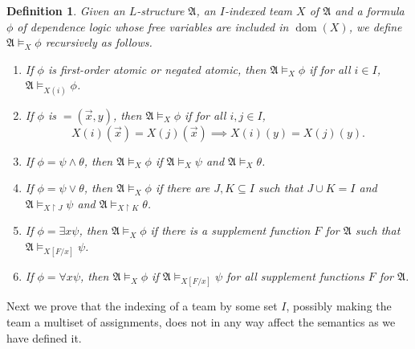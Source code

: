 \documentclass[10pt,a4paper]{amsart}
\newtheorem{definition}{Definition}[section]
\newcommand{\A}{\mathfrak{A}}
\newcommand{\dep}{\mathop{=}}
\DeclareMathOperator{\dom}{dom}
\begin{document}
\begin{definition}
    Given an $L$-structure $\A$, an $I$-indexed team $X$ of $\A$ and a formula $\phi$ of dependence logic whose free variables are included in $\dom(X)$, we define $\A\models_X\phi$ recursively as follows.
    \begin{enumerate}
        \item If $\phi$ is first-order atomic or negated atomic, then $\A\models_X\phi$ if for all $i\in I$, $\A\models_{X(i)}\phi$.
        \item If $\phi$ is $\dep(\vec x,y)$, then $\A\models_X\phi$ if for all $i,j\in I$,
        \[
            X(i)(\vec x) = X(j)(\vec x) \implies X(i)(y) = X(j)(y).
        \]
        \item If $\phi = \psi\land\theta$, then $\A\models_X\phi$ if $\A\models_X\psi$ and $\A\models_X\theta$.
        \item If $\phi = \psi\lor\theta$, then $\A\models_X\phi$ if there are $J,K\subseteq I$ such that $J\cup K = I$ and $\A\models_{X\restriction J}\psi$ and $\A\models_{X\restriction K}\theta$.
        \item If $\phi = \exists x \psi$, then $\A\models_X\phi$ if there is a supplement function $F$ for $\A$ such that $\A\models_{X[F/x]}\psi$.
        \item If $\phi = \forall x\psi$, then $\A\models_X\phi$ if $\A\models_{X[F/x]}\psi$ for all supplement functions $F$ for $\A$.
    \end{enumerate}
\end{definition}

Next we prove that the indexing of a team by some set $I$, possibly making the team a multiset of assignments, does not in any way affect the semantics as we have defined it.
\end{document}
